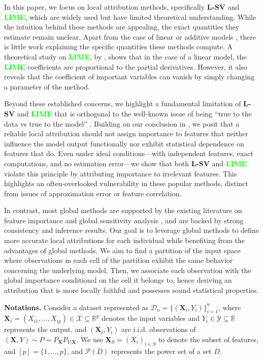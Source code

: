\documentclass{article}
\newcommand\X{\boldsymbol{X}}
\theoremstyle{plain}
\theoremstyle{definition}
\theoremstyle{remark}
\newcommand{\lsv}{\textcolor{lsv}{\textbf{L-SV}}}
\newcommand{\lime}{\textcolor{lime}{\textbf{LIME}}}
\begin{document}
In this paper, we focus on local attribution methods, specifically \lsv{} and \lime{}, which are widely used but have limited theoretical understanding.
While the intuition behind these methods are appealing, the exact quantities they estimate remain unclear. Apart from the case of linear or additive models \citep{bordt2023shapley, garreau2020explaining}, there is little work explaining the specific quantities these methods compute. A theoretical study on \lime{}, by \cite{garreau2020explaining}, shows that in the case of a linear model, the \lime{} coefficients are proportional to the partial derivatives.  However, it also reveals that the coefficient of important variables can vanish by simply changing a parameter of the method. 

Beyond these established concerns, we highlight a fundamental limitation of \lsv{} and \lime{} that is orthogonal to the well-known issue of being “true to the data vs true to the model” \citep{chen2020true}. Building on our conclusion in \cite{amoukou2021accurate}, we posit that a reliable local attribution should not assign importance to features that neither influence the model output functionally nor exhibit statistical dependence on features that do. Even under ideal conditions—with independent features, exact computations, and no estimation error—we show that both \lsv{} and \lime{} violate this principle by attributing importance to irrelevant features. This highlights an often-overlooked vulnerability in these popular methods, distinct from issues of approximation error or feature correlation. 

In contrast, most global methods are supported by the existing literature on feature importance \citep{breiman2001random, Lei2016DistributionFreePI, williamson2020efficient} and global sensitivity analysis \citep{iooss2015review}, and are backed by strong consistency and inference results. Our goal is to leverage global methods to define more accurate local attributions for each individual while benefiting from the advantages of global methods. We aim to find a partition of the input space where observations in each cell of the partition exhibit the same behavior concerning the underlying model. Then, we associate each observation with the global importance conditional on the cell it belongs to, hence deriving an attribution that is more locally faithful and possesses sound statistical properties.

\textbf{Notations.} Consider a dataset represented as $\mathcal{D}_n = \{(\X_i, Y_i)\}_{i=1}^n$, where $\X_i=(X_{i1}, \dots, X_{ip}) \in \mathcal{X} \subseteq \mathbb{R}^p$ denotes the input variables and $Y_i \in \mathcal{Y} \subseteq \mathbb{R}$ represents the output, and $(\X_i, Y_i)$ are i.i.d. observations of $(\X, Y) \sim P = P_{\X} P_{Y |\X}$. We use $\X_S = (X_i)_{i \in S}$ to denote the subset of features, and $[p] = \{1, \dots, p\}$, and $\mathcal{P}(D)$ represents the power set of a set $D$.
\vspace{-0.3cm}
\end{document}
